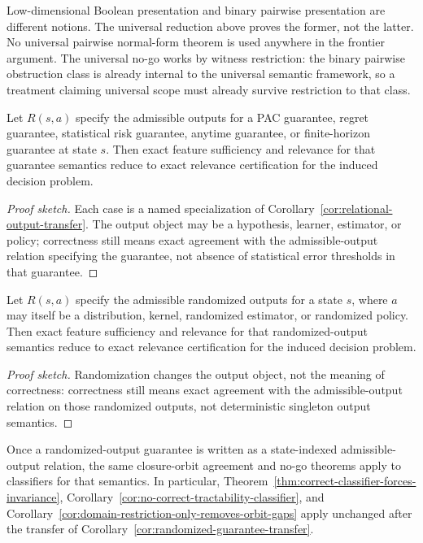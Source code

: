 Low-dimensional Boolean presentation and binary pairwise presentation are different notions. The universal reduction above proves the former, not the latter. No universal pairwise normal-form theorem is used anywhere in the frontier argument. The universal no-go works by witness restriction: the binary pairwise obstruction class is already internal to the universal semantic framework, so a treatment claiming universal scope must already survive restriction to that class.

\begin{corollary}\label{cor:statistical-guarantee-transfer}
Let $R(s,a)$ specify the admissible outputs for a PAC guarantee, regret guarantee, statistical risk guarantee, anytime guarantee, or finite-horizon guarantee at state $s$. Then exact feature sufficiency and relevance for that guarantee semantics reduce to exact relevance certification for the induced decision problem.
\end{corollary}

\begin{proof}[Proof sketch]
Each case is a named specialization of Corollary~\ref{cor:relational-output-transfer}. The output object may be a hypothesis, learner, estimator, or policy; correctness still means exact agreement with the admissible-output relation specifying the guarantee, not absence of statistical error thresholds in that guarantee.
\end{proof}

\begin{corollary}\label{cor:randomized-guarantee-transfer}
Let $R(s,a)$ specify the admissible randomized outputs for a state $s$, where $a$ may itself be a distribution, kernel, randomized estimator, or randomized policy. Then exact feature sufficiency and relevance for that randomized-output semantics reduce to exact relevance certification for the induced decision problem.
\end{corollary}

\begin{proof}[Proof sketch]
Randomization changes the output object, not the meaning of correctness: correctness still means exact agreement with the admissible-output relation on those randomized outputs, not deterministic singleton output semantics.
\end{proof}

\begin{corollary}\label{cor:randomized-guarantee-closure-consequences}
Once a randomized-output guarantee is written as a state-indexed admissible-output relation, the same closure-orbit agreement and no-go theorems apply to classifiers for that semantics. In particular, Theorem~\ref{thm:correct-classifier-forces-invariance}, Corollary~\ref{cor:no-correct-tractability-classifier}, and Corollary~\ref{cor:domain-restriction-only-removes-orbit-gaps} apply unchanged after the transfer of Corollary~\ref{cor:randomized-guarantee-transfer}.
\end{corollary}

